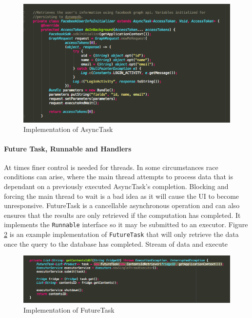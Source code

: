 \documentclass[a4paper, 11pt]{article}
\begin{document}
\begin{figure}[!htbp]
\centering
\includegraphics[width=\textwidth]{async}
\caption{Implementation of AsyncTask} \label{fig:async}
\end{figure}

\paragraph{Future Task, Runnable and Handlers } At times finer control is needed for threads. In some circumstances race conditions can arise, where the main thread attempts to process data that is dependant on a previously executed AsyncTask's completion. Blocking and forcing the main thread to wait is a bad idea as it will cause the UI to become unresponsive. FutureTask is a cancellable asynchronous operation and can also ensures that the results are only retrieved if the computation has completed. It implements the \texttt{Runnable} interface so it may be submitted to an executor. Figure \ref{fig:future} is an example implementation of \texttt{FutureTask} that will only retrieve the data once the query to the database has completed. Stream of data and execute


\begin{figure}[!htbp]
\centering
\includegraphics[width=\textwidth]{future}
\caption{Implementation of FutureTask} \label{fig:future}
\end{figure}
\end{document}
